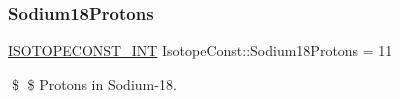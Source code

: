 \subsubsection{\texorpdfstring{Sodium18\+Protons}{Sodium18Protons}}
{\footnotesize\ttfamily \mbox{\hyperlink{group___isotope_const-_macros_ga5f18360b3e99483a35c32d789e62621c}{I\+S\+O\+T\+O\+P\+E\+C\+O\+N\+S\+T\+\_\+\+I\+NT}} Isotope\+Const\+::\+Sodium18\+Protons = 11}

\$ \$ Protons in Sodium-\/18. 